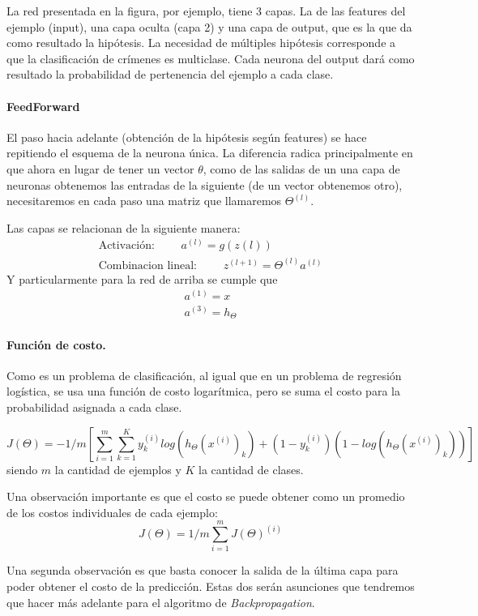 La red presentada en la figura, por ejemplo, tiene 3 capas. La de las features del ejemplo (input), una capa oculta (capa 2) y una capa de output, que es la que da como resultado la hipótesis. La necesidad de múltiples hipótesis corresponde a que la clasificación de crímenes es multiclase. Cada neurona del output dará como resultado la probabilidad de pertenencia del ejemplo a cada clase.

\paragraph{FeedForward}
El paso hacia adelante (obtención de la hipótesis según features) se hace repitiendo el esquema de la neurona única. La diferencia radica principalmente en que ahora en lugar de tener un vector $\theta$, como de las salidas de un una capa de neuronas obtenemos las entradas de la siguiente (de un vector obtenemos otro), necesitaremos en cada paso una matriz que llamaremos $\Theta^{(l)}$.

Las capas se relacionan de la siguiente manera:
\begin{eqnarray}
\text{Activación: } \qquad a^{(l)} = g(z(l)) \\
\text{Combinacion lineal: } \qquad z^{(l+1)} = \Theta^{(l)} a^{(l)}
\end{eqnarray}
Y particularmente para la red de arriba se cumple que
\begin{eqnarray}
a^{(1)} = x \\
a^{(3)} = h_{\Theta}
\end{eqnarray}
\paragraph{Función de costo.} Como es un problema de clasificación, al igual que en un problema de regresión logística, se usa una función de costo logarítmica, pero se suma el costo para la probabilidad asignada a cada clase.

\begin{equation}
J(\Theta) = -{1}/{m} \left[ \sum_{i = 1}^{m}\sum_{k = 1}^{K} y_k^{(i)}log(h_\Theta(x^{(i)})_k) + (1-y_k^{(i)})(1-log(h_\Theta(x^{(i)})_k)) \right]
\end{equation}
siendo $m$ la cantidad de ejemplos y $K$ la cantidad de clases.

Una observación importante es que el costo se puede obtener como un promedio de los costos individuales de cada ejemplo:
\begin{equation}
J(\Theta) = 1/m \sum_{i=1}^{m}J(\Theta)^{(i)}
\end{equation}

Una segunda observación es que basta conocer la salida de la última capa para poder obtener el costo de la predicción. Estas dos serán asunciones que tendremos que hacer más adelante para el algoritmo de \emph{Backpropagation}.
